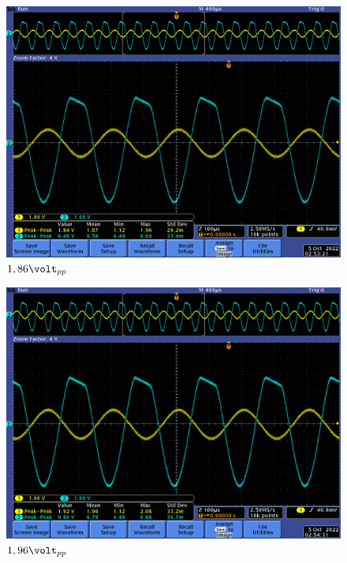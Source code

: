 \documentclass[12pt,letterpaper]{article}     %
\begin{document}
{\begin{figure}[!ht]
\centering
\includegraphics[scale=0.5]{imagenes/7.png}
\caption{$1,86\volt_{pp}$}
\label{fig:7}
\end{figure}

\begin{figure}[!ht]
\centering
\includegraphics[scale=0.5]{imagenes/8.png}
\caption{$1,96\volt_{pp}$}
\label{fig:8}
\end{figure}

}
\end{document}
